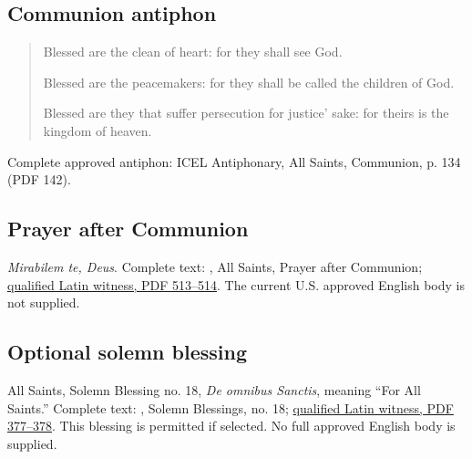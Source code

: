 \subsection{Communion antiphon}
\label{proper-communion-antiphon}
\begin{quote}
Blessed are the clean of heart: for they shall see God.

Blessed are the peacemakers: for they shall be called the children of God.

Blessed are they that suffer persecution for justice’ sake: for theirs is the kingdom of heaven.
\end{quote}
Complete approved antiphon: ICEL Antiphonary, All Saints, Communion, p. 134 (PDF 142).

\subsection{Prayer after Communion}
\label{proper-prayer-after-communion}
\textit{Mirabilem te, Deus}. Complete text: , All Saints, Prayer after Communion; \href{https://media.musicasacra.com/books/latin_missal2002.pdf#page=513}{qualified Latin witness, PDF 513--514}. The current U.S. approved English body is not supplied.

\subsection{Optional solemn blessing}
\label{proper-solemn-blessing}
All Saints, Solemn Blessing no. 18, \textit{De omnibus Sanctis}, meaning ``For All Saints.'' Complete text: , Solemn Blessings, no. 18; \href{https://media.musicasacra.com/books/latin_missal2002.pdf#page=377}{qualified Latin witness, PDF 377--378}. This blessing is permitted if selected. No full approved English body is supplied.

